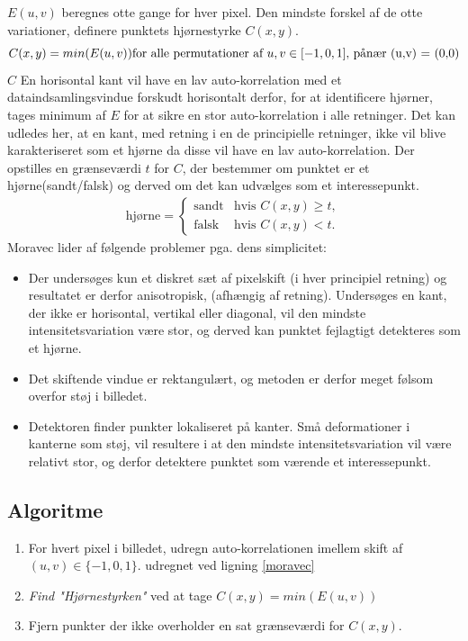 $E(u,v)$ beregnes otte gange for hver pixel. Den mindste forskel af de otte variationer, definere punktets hjørnestyrke $C(x,y)$.
$$
C(x,y)=min(E(u,v)) \text{$ $for alle permutationer af $u,v \in [-1,0,1]$, pånær (u,v) = (0,0)}
$$
$C$
En horisontal kant vil have en lav auto-korrelation med et dataindsamlingsvindue forskudt horisontalt derfor, for at identificere hjørner, tages minimum af $E$ for at sikre en stor auto-korrelation i alle retninger.
Det kan udledes her, at en kant, med retning i en de principielle retninger, ikke vil blive karakteriseret som et hjørne da disse vil have  en lav auto-korrelation.
Der opstilles en grænseværdi $t$ for $C$, der bestemmer om punktet er et hjørne(sandt/falsk) og derved om det kan udvælges som et interessepunkt.
\begin{equation}
\begin{split}
\text{hjørne} = 
\begin{cases}
\text{sandt}& \text{hvis } C(x,y)\geq t, \\
\text{falsk }& \text{hvis } C(x,y) < t.
\end{cases}
\end{split}
\label{cornerind}
\end{equation}
Moravec lider af følgende problemer pga. dens simplicitet:
\begin{itemize}
\item{Der undersøges kun et diskret sæt af pixelskift (i hver principiel retning) og resultatet er derfor anisotropisk, (afhængig af retning). Undersøges en kant, der ikke er horisontal, vertikal eller diagonal, vil den mindste intensitetsvariation være stor, og derved kan punktet fejlagtigt detekteres som et hjørne.}
\item{Det skiftende vindue er rektangulært, og metoden er derfor meget følsom overfor støj i billedet.}
\item{Detektoren finder punkter lokaliseret på kanter. Små deformationer i kanterne som støj, vil resultere i at den mindste intensitetsvariation vil være relativt stor, og derfor detektere punktet som værende et interessepunkt.}
\end{itemize}
\subsection{Algoritme}
\begin{enumerate}
\item{For hvert pixel i billedet, udregn auto-korrelationen imellem skift af $(u,v) \in \lbrace-1,0,1\rbrace$. udregnet ved ligning \ref{moravec}}
\item{\textit{Find "Hjørnestyrken"} ved at tage $C(x,y)=min(E(u,v))$}
\item{Fjern punkter der ikke overholder en sat grænseværdi for $C(x,y)$.}
\end{enumerate}
